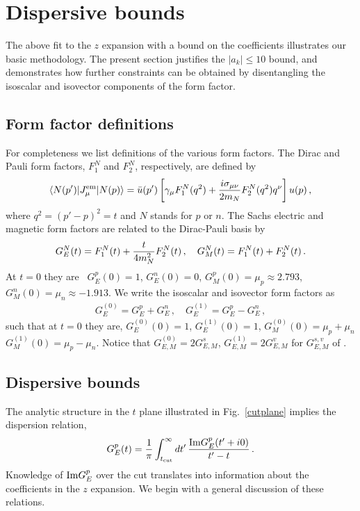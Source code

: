 \documentclass[12pt]{article}
\newcommand{\be}{\begin{equation}}
\newcommand{\ee}{\end{equation}}
\begin{document}
\section{Dispersive bounds\label{sec:bounds}} 

The above fit to the $z$ expansion with a bound on the coefficients illustrates our
basic methodology. The present section justifies the $|a_k|\le 10$ bound, and demonstrates how
further constraints can be obtained by disentangling the isoscalar and isovector components of
the form factor. 

\subsection {Form factor definitions \label{sec:def}}

For completeness we list definitions of the various form
factors. The Dirac and Pauli form factors, $F^N_1$ and $F^N_2$, 
respectively, are defined by \cite{Foldy:1952,Salzman:1955zz}
\be
\langle N(p')|J_\mu^{\rm em}|N(p)\rangle=\bar u(p')
\left[\gamma_\mu F^N_1(q^2)+\frac{i\sigma_{\mu\nu}}{2m_N}F^N_2(q^2)q^\nu\right]u(p)\,,
\ee
where $q^2=(p'-p)^2=t$ and $N$ stands for $p$ or $n$. 
The Sachs electric and magnetic form factors
are related to the Dirac-Pauli basis by \cite{Ernst:1960zza}
\begin{align}
G^N_E(t) = F^N_1(t) + {t\over 4m_N^2} F^N_2(t) \,, \quad
G^N_M(t) = F^N_1(t) + F^N_2(t) \,. 
\end{align}
At $t=0$ they are~\cite{Nakamura:2010}
$G^p_E(0) = 1$,
$G^n_E(0) = 0$,
$G^p_M(0) = \mu_p \approx 2.793$, 
$G^n_M(0) = \mu_n\approx -1.913$.
We write the isoscalar and isovector form factors as
\begin{align}
G_E^{(0)} = G_E^{p} + G_E^{n} \,, \quad
G_E^{(1)} = G_E^{p} - G_E^{n} \,, 
\end{align} 
such that at $t=0$ they are,
$G_E^{(0)}(0) = 1$, 
$G_E^{(1)}(0) = 1$,  
$G_M^{(0)}(0) = \mu_p+\mu_n$ 
$G_M^{(1)}(0) = \mu_p-\mu_n$.
Notice that $G^{(0)}_{E,M}=2G^{s}_{E,M}$, $G^{(1)}_{E,M}=2G^{v}_{E,M}$ for $G^{s,v}_{E,M}$ of \cite{Belushkin:2006qa}.

\subsection{Dispersive bounds}

The analytic structure in the $t$ plane illustrated in Fig.~\ref{cutplane} 
implies the dispersion relation, 
\begin{align}
G_E^p(t) = {1\over \pi} \int_{t_{\rm cut}}^\infty {dt^\prime}\, {{\rm Im}G_E^p(t^\prime + i0) \over t^\prime - t } \,. 
\end{align}
Knowledge of ${\rm Im}G_E^p$ over the cut translates into information about the
coefficients in the $z$ expansion. We begin with a general discussion of these
relations.
\end{document}
